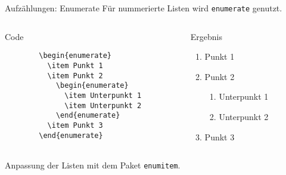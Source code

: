 \begin{frame}[fragile]{Aufzählungen: Enumerate}
  Für nummerierte Listen wird \texttt{enumerate} genutzt.
  \begin{columns}[onlytextwidth, t]
    \begin{column}{0.48\textwidth}
      \begin{block}{Code}
        \begin{lstlisting}
        \begin{enumerate}
          \item Punkt 1
          \item Punkt 2
            \begin{enumerate}
              \item Unterpunkt 1
              \item Unterpunkt 2
            \end{enumerate}
          \item Punkt 3
        \end{enumerate}
        \end{lstlisting}
      \end{block}
    \end{column}
    \begin{column}{0.48\textwidth}
      \begin{block}{Ergebnis}
        \begin{enumerate}
          \item Punkt 1
          \item Punkt 2
            \begin{enumerate}
              \item Unterpunkt 1
              \item Unterpunkt 2
            \end{enumerate}
          \item Punkt 3
        \end{enumerate}
      \end{block}
    \end{column}
  \end{columns}
  Anpassung der Listen mit dem Paket \texttt{enumitem}.
\end{frame}

